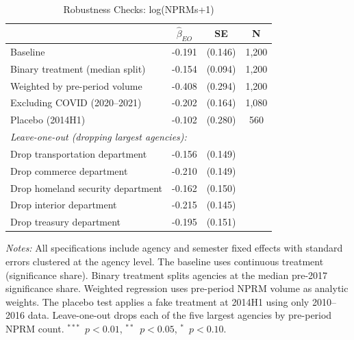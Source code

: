 \begin{table}[htbp]
\centering
\caption{Robustness Checks: log(NPRMs+1)}
\label{tab:robust}
\begin{threeparttable}
\begin{tabular}{lccc}
\toprule
 & $\hat{\beta}_{EO}$ & SE & N \\
\midrule
Baseline & -0.191 & (0.146) & 1,200 \\
Binary treatment (median split) & -0.154 & (0.094) & 1,200 \\
Weighted by pre-period volume & -0.408 & (0.294) & 1,200 \\
Excluding COVID (2020--2021) & -0.202 & (0.164) & 1,080 \\
Placebo (2014H1) & -0.102 & (0.280) & 560 \\
\midrule
\multicolumn{4}{l}{\textit{Leave-one-out (dropping largest agencies):}} \\
\quad Drop transportation department & -0.156 & (0.149) & \\
\quad Drop commerce department & -0.210 & (0.149) & \\
\quad Drop homeland security department & -0.162 & (0.150) & \\
\quad Drop interior department & -0.215 & (0.145) & \\
\quad Drop treasury department & -0.195 & (0.151) & \\
\bottomrule
\end{tabular}
\begin{tablenotes}[flushleft]\footnotesize
\item \textit{Notes:} All specifications include agency and semester fixed effects with standard errors clustered at the agency level. The baseline uses continuous treatment (significance share). Binary treatment splits agencies at the median pre-2017 significance share. Weighted regression uses pre-period NPRM volume as analytic weights. The placebo test applies a fake treatment at 2014H1 using only 2010--2016 data. Leave-one-out drops each of the five largest agencies by pre-period NPRM count. $^{***}$~$p<0.01$, $^{**}$~$p<0.05$, $^{*}$~$p<0.10$.
\end{tablenotes}
\end{threeparttable}
\end{table}
